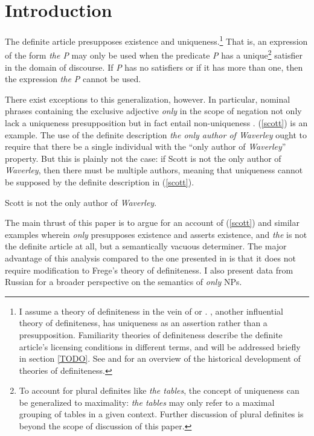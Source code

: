 \section{Introduction \label{sec:intro}}
The definite article presupposes existence and uniqueness.\footnote{I assume a theory of definiteness in the vein of \citet{frege} or \citet{strawson50}. \citet{russell}, another influential theory of definiteness, has uniqueness as an assertion rather than a presupposition. Familiarity theories of definiteness describe the definite article's licensing conditions in different terms, and will be addressed briefly in section \ref{TODO}. See \citet[chap. 1]{schwarz09} and \citet{horn-abbott-2012} for an overview of the historical development of theories of definiteness.} That is, an expression of the form \textit{the P} may only be used when the predicate \textit{P} has a unique\footnote{To account for plural definites like \textit{the tables}, the concept of uniqueness can be generalized to maximality: \textit{the tables} may only refer to a maximal grouping of tables in a given context. Further discussion of plural definites is beyond the scope of discussion of this paper.} satisfier in the domain of discourse. If \textit{P} has no satisfiers or if it has more than one, then the expression \textit{the P} cannot be used.

There exist exceptions to this generalization, however. In particular, nominal phrases containing the exclusive adjective \textit{only} in the scope of negation not only lack a uniqueness presupposition but in fact entail non-uniqueness \citep{cb2015}. (\ref{scott}) is an example. The use of the definite description \textit{the only author of Waverley} ought to require that there be a single individual with the ``only author of \textit{Waverley}'' property. But this is plainly not the case: if Scott is not the only author of \textit{Waverley}, then there must be multiple authors, meaning that uniqueness cannot be supposed by the definite description in (\ref{scott}).

\begin{exe}
	\ex \label{scott} Scott is not the only author of \textit{Waverley}.
\end{exe}

The main thrust of this paper is to argue for an account of (\ref{scott}) and similar examples wherein \textit{only} presupposes existence and asserts existence, and \textit{the} is not the definite article at all, but a semantically vacuous determiner. The major advantage of this analysis compared to the one presented in \citet{cb2015} is that it does not require modification to Frege's theory of definiteness. I also present data from Russian for a broader perspective on the semantics of \textit{only} NPs.

